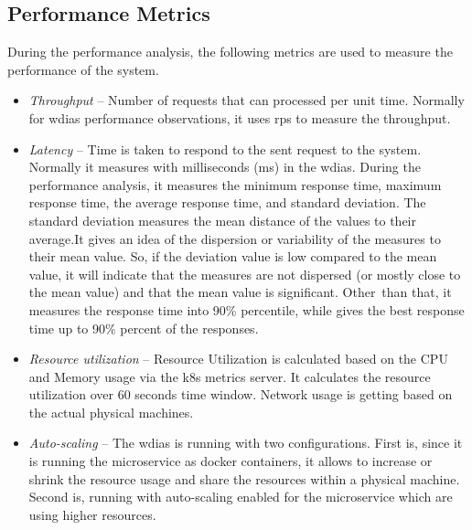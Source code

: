 \subsection{Performance Metrics}%
\label{subse:test_plan_metrics}
During the performance analysis, the following metrics are used to measure the performance of the system.
\begin{itemize}
    \item \emph{Throughput} -- Number of requests that can processed per unit time. Normally for \acrshort{wdias} performance observations, it uses \acrfull{rps} to measure the throughput.
    \item \emph{Latency} -- Time is taken to respond to the sent request to the system. Normally it measures with milliseconds (ms) in the \acrshort{wdias}. During the performance analysis, it measures the minimum response time, maximum response time, the average response time, and standard deviation. The standard deviation measures the mean distance of the values to their average.It gives an idea of the dispersion or variability of the measures to their mean value. So, if the deviation value is low compared to the mean value, it will indicate that the measures are not dispersed (or mostly close to the mean value) and that the mean value is significant. Other than that, it measures the response time into 90\% percentile, while gives the best response time up to 90\% percent of the responses.
    \item \emph{Resource utilization} -- Resource Utilization is calculated based on the CPU and Memory usage via the \acrshort{k8s} metrics server. It calculates the resource utilization over 60 seconds time window. Network usage is getting based on the actual physical machines.
    \item \emph{Auto-scaling} -- The \acrshort{wdias} is running with two configurations. First is, since it is running the microservice as docker containers, it allows to increase or shrink the resource usage and share the resources within a physical machine. Second is, running with auto-scaling enabled for the microservice which are using higher resources.
\end{itemize}

